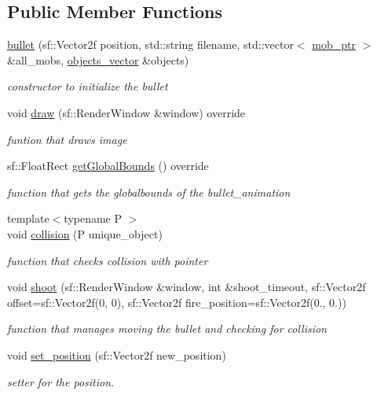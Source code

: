 \subsection*{Public Member Functions}
\begin{DoxyCompactItemize}
\item 
\hyperlink{classbullet_a2c8b1e868ab8fe8edf43fc289f8d80b8}{bullet} (sf\+::\+Vector2f position, std\+::string filename, std\+::vector$<$ \hyperlink{typedefs_8hpp_a09ee7f853fc9bc830a9445a06fd53d4b}{mob\+\_\+ptr} $>$ \&all\+\_\+mobs, \hyperlink{typedefs_8hpp_a6c0fdb1dfd0c34dbbdbb5dcd3c608b07}{objects\+\_\+vector} \&objects)
\begin{DoxyCompactList}\small\item\em constructor to initialize the bullet \end{DoxyCompactList}\item 
void \hyperlink{classbullet_ae999b952538687d45ca2ae54164a5cd8}{draw} (sf\+::\+Render\+Window \&window) override
\begin{DoxyCompactList}\small\item\em funtion that draws image \end{DoxyCompactList}\item 
sf\+::\+Float\+Rect \hyperlink{classbullet_a87bda5887249e8e37c5579180449bd93}{get\+Global\+Bounds} () override
\begin{DoxyCompactList}\small\item\em function that gets the globalbounds of the bullet\+\_\+animation \end{DoxyCompactList}\item 
{\footnotesize template$<$typename P $>$ }\\void \hyperlink{classbullet_ab7e5c677bbd642df24a2251bb58249b7}{collision} (P unique\+\_\+object)
\begin{DoxyCompactList}\small\item\em function that checks collision with pointer \end{DoxyCompactList}\item 
void \hyperlink{classbullet_a52d736cad2a486a65c8a25781cff1f70}{shoot} (sf\+::\+Render\+Window \&window, int \&shoot\+\_\+timeout, sf\+::\+Vector2f offset=sf\+::\+Vector2f(0, 0), sf\+::\+Vector2f fire\+\_\+position=sf\+::\+Vector2f(0., 0.))
\begin{DoxyCompactList}\small\item\em function that manages moving the bullet and checking for collision \end{DoxyCompactList}\item 
void \hyperlink{classbullet_af338da31bfb1dd4b2d942ca67316350a}{set\+\_\+position} (sf\+::\+Vector2f new\+\_\+position)
\begin{DoxyCompactList}\small\item\em setter for the position. \end{DoxyCompactList}\end{DoxyCompactItemize}
